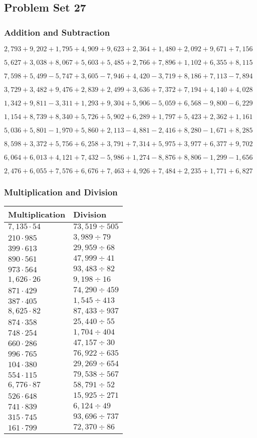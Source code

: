 \hypertarget{problem-set-27-3}{%
\subsection{Problem Set 27}\label{problem-set-27-3}}

\hypertarget{addition-and-subtraction-189}{%
\subsubsection{Addition and
Subtraction}\label{addition-and-subtraction-189}}

\(2,793+9,202+1,795+4,909+9,623+2,364+1,480+2,092+9,671+ 7,156\)

\(5,627+3,038+8,067+5,603+5,485+2,766+7,896+1,102+6,355+8,115\)

\(7,598+5,499-5,747+3,605-7,946+4,420-3,719+8,186+7,113-7,894\)

\(3,729+3,482+9,476+2,839+2,499+3,636+7,372+7,194+4,140+4,028\)

\(1,342+9,811-3,311+1,293+9,304+5,906-5,059+6,568-9,800-6,229\)

\(1,154+8,739+8,340+5,726+5,902+6,289+1,797+5,423+2,362+1,161\)

\(5,036+5,801-1,970+5,860+2,113-4,881-2,416+8,280-1,671+8,285\)

\(8,598+3,372+5,756+6,258+3,791+7,314+5,975+3,977+6,377+9,702\)

\(6,064+6,013+4,121+7,432-5,986+1,274-8,876+8,806-1,299-1,656\)

\(2,476+6,055+7,576+6,676+7,463+4,926+7,484+2,235+1,771+6,827\)

\hypertarget{multiplication-and-division-188}{%
\subsubsection{Multiplication and
Division}\label{multiplication-and-division-188}}

\begin{longtable}[]{@{}ll@{}}
\toprule
Multiplication & Division\tabularnewline
\midrule
\endhead
\(7,135\cdot54\) & \(73,519÷505\)\tabularnewline
\(210\cdot985\) & \(3,989÷79\)\tabularnewline
\(399\cdot613\) & \(29,959÷68\)\tabularnewline
\(890\cdot561\) & \(47,999 ÷41\)\tabularnewline
\(973\cdot564\) & \(93,483÷82\)\tabularnewline
\(1,626\cdot26\) & \(9,198÷16\)\tabularnewline
\(871\cdot429\) & \(74,290÷459\)\tabularnewline
\(387\cdot405\) & \(1,545÷413\)\tabularnewline
\(8,625\cdot82\) & \(87,433÷937\)\tabularnewline
\(874\cdot358\) & \(25,440÷55\)\tabularnewline
\(748\cdot254\) & \(1,704÷404\)\tabularnewline
\(660\cdot286\) & \(47,157÷30\)\tabularnewline
\(996\cdot765\) & \(76,922÷635\)\tabularnewline
\(104\cdot380\) & \(29,269÷654\)\tabularnewline
\(554\cdot115\) & \(79,538÷567\)\tabularnewline
\(6,776\cdot87\) & \(58,791÷52\)\tabularnewline
\(526\cdot648\) & \(15,925÷271\)\tabularnewline
\(741\cdot839\) & \(6,124÷49\)\tabularnewline
\(315\cdot745\) & \(93,696÷737\)\tabularnewline
\(161\cdot799\) & \(72,370÷86\)\tabularnewline
\bottomrule
\end{longtable}

